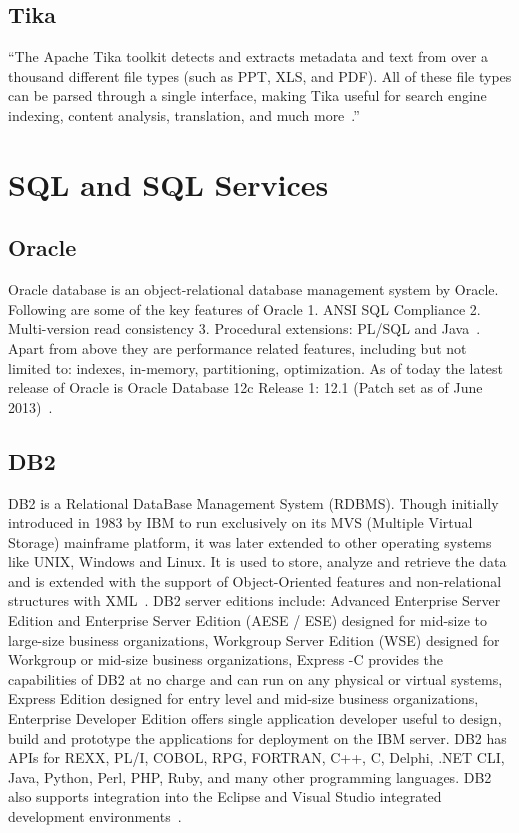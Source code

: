      \pv
     
\subsection{Tika}

``The Apache Tika toolkit detects and extracts metadata and text from
over a thousand different file types (such as PPT, XLS, and PDF). All
of these file types can be parsed through a single interface, making
Tika useful for search engine indexing, content analysis, translation,
and much more~\cite{www-tika}.''


\section{SQL and SQL Services}
\label{S:o-sql}

\subsection{Oracle}

Oracle database is an object-relational database management system by
Oracle. Following are some of the key features of Oracle 1. ANSI SQL
Compliance 2. Multi-version read consistency 3. Procedural extensions:
PL/SQL and Java~\cite{www-oracle}.  Apart from above they are
performance related features, including but not limited to: indexes,
in-memory, partitioning, optimization.  As of today the latest release
of Oracle is Oracle Database 12c Release 1: 12.1 (Patch set as of June
2013)~\cite{www-oracle}.

     \pv


\subsection{DB2}

DB2 is a Relational DataBase Management System (RDBMS). Though
initially introduced in 1983 by IBM to run exclusively on its MVS
(Multiple Virtual Storage) mainframe platform, it was later extended
to other operating systems like UNIX, Windows and Linux. It is used to
store, analyze and retrieve the data and is extended with the support
of Object-Oriented features and non-relational structures with
XML~\cite{www-DB2Intro}. DB2 server editions include: Advanced
Enterprise Server Edition and Enterprise Server Edition (AESE / ESE)
designed for mid-size to large-size business organizations, Workgroup
Server Edition (WSE) designed for Workgroup or mid-size business
organizations, Express -C provides the capabilities of DB2 at no
charge and can run on any physical or virtual systems, Express Edition
designed for entry level and mid-size business organizations,
Enterprise Developer Edition offers single application developer
useful to design, build and prototype the applications for deployment
on the IBM server. DB2 has APIs for REXX, PL/I, COBOL, RPG, FORTRAN,
C++, C, Delphi, .NET CLI, Java, Python, Perl, PHP, Ruby, and many
other programming languages. DB2 also supports integration into the
Eclipse and Visual Studio integrated development
environments~\cite{www-DB2Wiki}.


